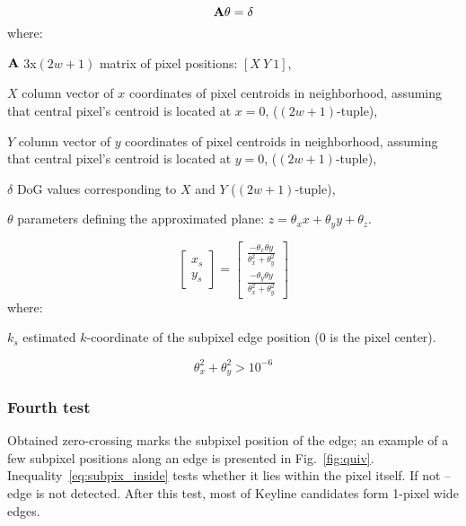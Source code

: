 \begin{equation}
\textbf{A}\theta = \delta
\label{eq:regress}
\end{equation}
where:
\begin{eqwhere}[2cm]
	\item[$\textbf{A}$] 3x$(2w+1)$ matrix of pixel positions: $[X\ Y\ 1]$,
	\item[$X$] column vector of $x$ coordinates of pixel centroids in neighborhood, assuming that central pixel's centroid is located at $x = 0$, ($(2w+1)$-tuple),
	\item[$Y$] column vector of $y$ coordinates of pixel centroids in neighborhood, assuming that central pixel's centroid is located at $y = 0$, ($(2w+1)$-tuple),
	\item[$\delta$] DoG values corresponding to $X$ and $Y$ ($(2w+1)$-tuple),
	\item[$\theta$] parameters defining the approximated plane: $z = \theta_{x}x + \theta_{y}y + \theta_{z}$.
\end{eqwhere}



\begin{equation}
\begin{bmatrix}
x_s \\
y_s 
\end{bmatrix} = 
\begin{bmatrix}
\frac{-\theta_{x} \theta{y}}{\theta_x^2 + \theta_y^2} \\
\frac{-\theta_{y} \theta{y}}{\theta_x^2 + \theta_y^2}
\end{bmatrix}
\label{eq:zerocross}
\end{equation}
where:
\begin{eqwhere}[2cm]
	\item[$k_s$] estimated $k$-coordinate of the subpixel edge position (0 is the pixel center).
\end{eqwhere}

\begin{equation}
\theta_{x}^2 + \theta_{y}^2 > 10^{-6}
\label{eq:test3}
\end{equation}

\subsubsection{Fourth test}
\label{edge_fourth}

Obtained zero-crossing marks the subpixel position of the edge; an example of a few subpixel positions along an edge is presented in Fig.~\ref{fig:quiv}. Inequality~\ref{eq:subpix_inside} tests whether it lies within the pixel itself. If not -- edge is not detected. After this test, most of Keyline candidates form 1-pixel wide edges.

